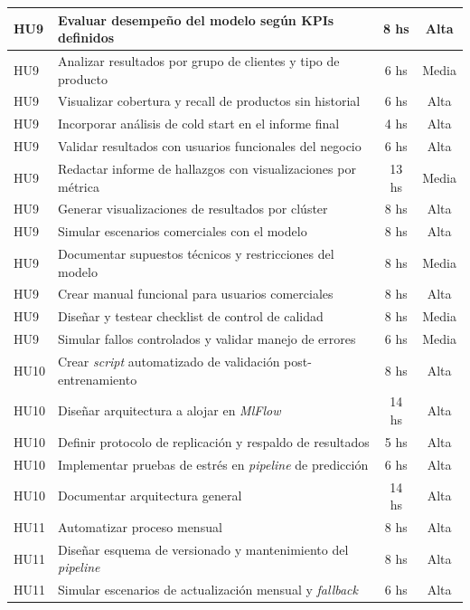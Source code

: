 \documentclass[
11pt, %
]{charter}
\begin{document}
\begin{longtable}{|p{2cm}|p{10cm}|c|c|}
HU9 & Evaluar desempeño del modelo según KPIs definidos & 8 hs & Alta \\ \hline
HU9 & Analizar resultados por grupo de clientes y tipo de producto & 6 hs & Media \\ \hline
HU9 & Visualizar cobertura y recall de productos sin historial & 6 hs & Alta \\ \hline
HU9 & Incorporar análisis de cold start en el informe final & 4 hs & Alta \\ \hline
HU9 & Validar resultados con usuarios funcionales del negocio & 6 hs & Alta \\ \hline
HU9 & Redactar informe de hallazgos con visualizaciones por métrica & 13 hs & Media \\ \hline
HU9 & Generar visualizaciones de resultados por clúster & 8 hs & Alta \\ \hline
HU9 & Simular escenarios comerciales con el modelo & 8 hs & Alta \\ \hline
HU9 & Documentar supuestos técnicos y restricciones del modelo & 8 hs & Media \\ \hline
HU9 & Crear manual funcional para usuarios comerciales & 8 hs & Alta \\ \hline
HU9 & Diseñar y testear checklist de control de calidad & 8 hs & Media \\ \hline
HU9 & Simular fallos controlados y validar manejo de errores & 6 hs & Media \\ \hline

HU10 & Crear \textit{script} automatizado de validación post-entrenamiento & 8 hs & Alta \\ \hline
HU10 & Diseñar arquitectura a alojar en \textit{MlFlow} & 14 hs & Alta \\ \hline
HU10 & Definir protocolo de replicación y respaldo de resultados & 5 hs & Alta \\ \hline
HU10 & Implementar pruebas de estrés en \textit{pipeline} de predicción & 6 hs & Alta \\ \hline
HU10 & Documentar arquitectura general & 14 hs & Alta \\ \hline

HU11 & Automatizar proceso mensual & 8 hs & Alta \\ \hline
HU11 & Diseñar esquema de versionado y mantenimiento del \textit{pipeline} & 8 hs & Alta \\ \hline
HU11 & Simular escenarios de actualización mensual y \textit{fallback} & 6 hs & Alta \\ \hline


\end{longtable}
\end{document}

